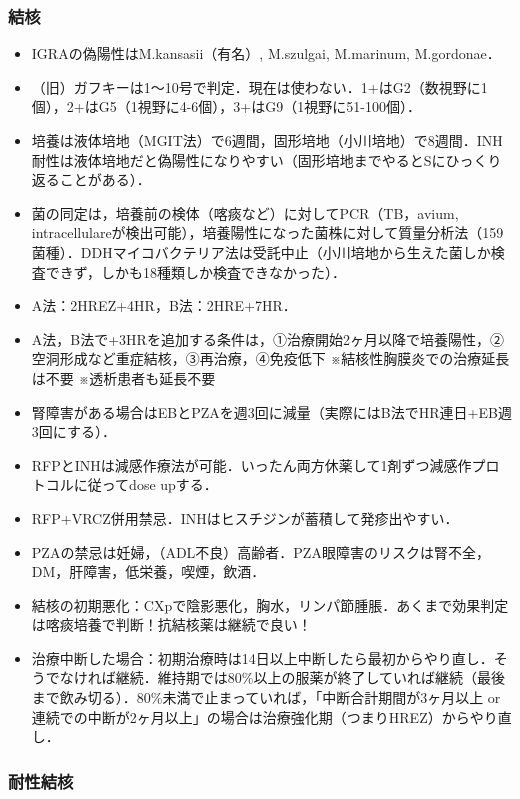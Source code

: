 \subsubsection{結核}

\begin{itemize}
\item IGRAの偽陽性はM.kansasii（有名）, M.szulgai, M.marinum, M.gordonae．
\item （旧）ガフキーは1〜10号で判定．現在は使わない．1+はG2（数視野に1個），2+はG5（1視野に4-6個），3+はG9（1視野に51-100個）．
\item 培養は液体培地（MGIT法）で6週間，固形培地（小川培地）で8週間．INH耐性は液体培地だと偽陽性になりやすい（固形培地までやるとSにひっくり返ることがある）．
\item 菌の同定は，培養前の検体（喀痰など）に対してPCR（TB，avium, intracellulareが検出可能），培養陽性になった菌株に対して質量分析法（159菌種）．DDHマイコバクテリア法は受託中止（小川培地から生えた菌しか検査できず，しかも18種類しか検査できなかった）．
\item A法：2HREZ+4HR，B法：2HRE+7HR．
\item A法，B法で+3HRを追加する条件は，①治療開始2ヶ月以降で培養陽性，②空洞形成など重症結核，③再治療，④免疫低下 ※結核性胸膜炎での治療延長は不要 ※透析患者も延長不要
\item 腎障害がある場合はEBとPZAを週3回に減量（実際にはB法でHR連日+EB週3回にする）．
\item RFPとINHは減感作療法が可能．いったん両方休薬して1剤ずつ減感作プロトコルに従ってdose upする．
\item RFP+VRCZ併用禁忌．INHはヒスチジンが蓄積して発疹出やすい．
\item PZAの禁忌は妊婦，（ADL不良）高齢者．PZA眼障害のリスクは腎不全，DM，肝障害，低栄養，喫煙，飲酒．
\item 結核の初期悪化：CXpで陰影悪化，胸水，リンパ節腫脹．あくまで効果判定は喀痰培養で判断！抗結核薬は継続で良い！
\item 治療中断した場合：初期治療時は14日以上中断したら最初からやり直し．そうでなければ継続．維持期では80\%以上の服薬が終了していれば継続（最後まで飲み切る）．80\%未満で止まっていれば，「中断合計期間が3ヶ月以上 or 連続での中断が2ヶ月以上」の場合は治療強化期（つまりHREZ）からやり直し．
\end{itemize}


\subsubsection{耐性結核}

